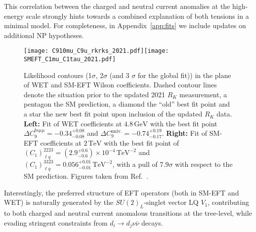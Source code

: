 \documentclass[a4paper,11pt]{article}
\def\rk{R_{K}}
\begin{document}
This correlation between the charged and neutral current anomalies at the high-energy scale strongly hints towards a combined explanation of both tensions in a minimal model.
For completeness, in Appendix~\ref{app:fits}
we include updates on additional NP hypotheses.

\begin{figure}
    \centering
    \texttt{[image: C910mu\_C9u\_rkrks\_2021.pdf]}\texttt{[image: SMEFT\_C1mu\_C1tau\_2021.pdf]}
    \caption{Likelihood contours (1$\sigma$, 2$\sigma$ (and 3 $\sigma$ for the global fit)) in the plane of WET and SM-EFT Wilson coefficients. Dashed contour lines denote the situation prior to the updated 2021 $\rk$ measurement, a pentagon the SM prediction, a diamond the ``old'' best fit point and a star the new best fit point upon inclusion of the updated $\rk$ data. {\bf Left:} Fit of WET coefficients at $4.8\,\mathrm{GeV}$ with the best fit point $\Delta C_9^{bs\mu\mu} = -0.34^{+0.08}_{-0.08}$ and $\Delta C_9^\mathrm{univ.} = -0.74^{+0.19}_{-0.17}$. {\bf Right:} Fit of SM-EFT coefficients at $2\,\mathrm{TeV}$ with the best fit point of $(C_1)_{\ell q}^{2223} = (2.9^{+0.6}_{-0.6})\times 10^{-4}\,\mathrm{TeV}^{-2}$ and $(C_1)_{\ell q}^{3323} = 0.056^{+0.01}_{-0.01}\,\mathrm{TeV}^{-2}$, with a pull of $7.9\sigma$ with respect to the SM prediction. Figures taken from Ref.~\cite{talk}.}
    \label{fig:fits}
\end{figure}

Interestingly, the preferred structure of EFT operators (both in SM-EFT and WET) is naturally generated by the $SU(2)_L$-singlet vector LQ $V_1$, contributing to both charged and neutral current anomalous transitions at the tree-level, while evading stringent constraints from $d_i\to d_j \nu\bar\nu$ decays.
\end{document}
